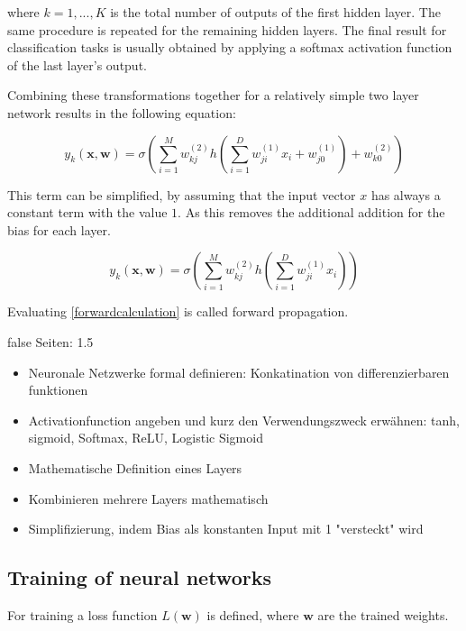 \documentclass[draft,final,oneside]{vutinfth} %
\begin{document}
where $k = 1, ..., K$ is the total number of outputs of the first hidden layer. The same procedure is repeated for the remaining hidden layers. The final result for classification tasks is usually obtained by applying a softmax activation function of the last layer's output.

Combining these transformations together for a relatively simple two layer network results in the following equation:

\begin{equation}
y_k(\boldsymbol{x}, \boldsymbol{w}) = \sigma\left(\sum_{i=1}^{M} w_{kj}^{(2)}h\left(\sum_{i=1}^{D} w_{ji}^{(1)}x_i + w_{j0}^{(1)}\right) + w_{k0}^{(2)}\right)
\end{equation}

This term can be simplified, by assuming that the input vector $x$ has always a constant term with the value $1$. As this removes the additional addition for the bias for each layer.

\begin{equation} \label{forwardcalculation}
y_k(\boldsymbol{x}, \boldsymbol{w}) = \sigma\left(\sum_{i=1}^{M} w_{kj}^{(2)}h\left(\sum_{i=1}^{D} w_{ji}^{(1)}x_i\right)\right)
\end{equation}

Evaluating \ref{forwardcalculation} is called forward propagation.

\if false
Seiten: 1.5
\begin{itemize}
\item Neuronale Netzwerke formal definieren: Konkatination von differenzierbaren funktionen
\item Activationfunction angeben und kurz den Verwendungszweck erwähnen: tanh, sigmoid, Softmax, ReLU, Logistic Sigmoid
\item Mathematische Definition eines Layers
\item Kombinieren mehrere Layers mathematisch
\item Simplifizierung, indem Bias als konstanten Input mit 1 "versteckt" wird

\end{itemize}

\fi

\subsection{Training of neural networks} \label{nntrain}

For training a loss function $L(\boldsymbol{w})$ is defined, where $\boldsymbol{w}$ are the trained weights.
\end{document}
